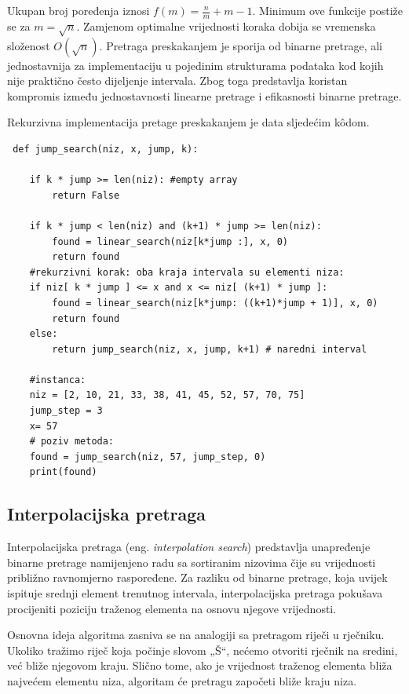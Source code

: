 Ukupan broj poređenja iznosi $f(m)=\frac{n}{m}+m-1.$
 Minimum ove funkcije postiže se za $m=\sqrt{n}.$ Zamjenom optimalne vrijednosti koraka dobija se vremenska složenost $O(\sqrt{n}).$ Pretraga preskakanjem je sporija od binarne pretrage, ali jednostavnija za implementaciju u pojedinim strukturama podataka kod kojih nije praktično često dijeljenje intervala. Zbog toga predstavlja koristan kompromis između jednostavnosti linearne pretrage i efikasnosti binarne pretrage.

 
 
Rekurzivna implementacija pretage preskakanjem  je data sljedećim k\^odom.  %
 
 \begin{verbatim}
 def jump_search(niz, x, jump, k):
 
 	if k * jump >= len(niz): #empty array
 		return False
 
 	if k * jump < len(niz) and (k+1) * jump >= len(niz): 
 		found = linear_search(niz[k*jump :], x, 0)
 		return found
 	#rekurzivni korak: oba kraja intervala su elementi niza: 
 	if niz[ k * jump ] <= x and x <= niz[ (k+1) * jump ]:
 		found = linear_search(niz[k*jump: ((k+1)*jump + 1)], x, 0)
 		return found
 	else:
 		return jump_search(niz, x, jump, k+1) # naredni interval
 
 	#instanca:
 	niz = [2, 10, 21, 33, 38, 41, 45, 52, 57, 70, 75]
 	jump_step = 3
 	x= 57
 	# poziv metoda:
 	found = jump_search(niz, 57, jump_step, 0)
 	print(found) 
 \end{verbatim}

\subsection{Interpolacijska pretraga}

Interpolacijska pretraga (eng. \emph{interpolation search}) predstavlja unapređenje binarne pretrage namijenjeno radu sa sortiranim nizovima čije su vrijednosti približno ravnomjerno raspoređene. Za razliku od binarne pretrage, koja uvijek ispituje srednji element trenutnog intervala, interpolacijska pretraga pokušava procijeniti poziciju traženog elementa na osnovu njegove vrijednosti.

Osnovna ideja algoritma zasniva se na analogiji sa pretragom riječi u rječniku. Ukoliko tražimo riječ koja počinje slovom „Š“, nećemo otvoriti rječnik na sredini, već bliže njegovom kraju. Slično tome, ako je vrijednost traženog elementa bliža najvećem elementu niza, algoritam će pretragu započeti bliže kraju niza.

